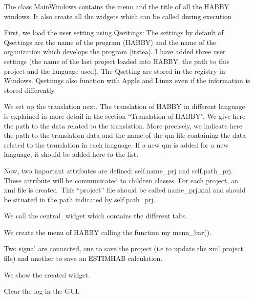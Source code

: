 \documentclass[letterpaper,10pt,english]{sphinxmanual}
\begin{document}
\begin{fulllineitems}
\label{\detokenize{index:src_GUI.Main_windows_1.MainWindows}}
The class MainWindows contains the menu and the title of all the HABBY windows.
It also create all the widgets which can be called during execution


First, we load the user setting using Qsettings: The settings by default of Qsettings are the name of the program (HABBY) and
the name of the organization which develops the program (irstea).  I have added three user settings (the name of the
last project loaded into HABBY, the path to this project and the language used). The Qsetting are stored in the
registry in Windows. Qsettings also function with Apple and Linux even if the information is stored differently

We set up the translation next. The translation of HABBY in different language is explained in more detail in
the section “Translation of HABBY”. We give here the path to the data related to the translation. More precisely, we indicate
here the path to the translation data and the name of the qm file containing the data related to the translation
in each language. If a new qm is added for a new language, it should be added here to the list.

Now, two important attributes are defined: self.name\_prj and self.path\_prj. These attribute will be communicated to
children classes. For each project, an xml file is created. This “project” file should be called name\_prj.xml
and should be situated in the path indicated by self.path\_prj.

We call the central\_widget which contains the different tabs.

We create the menu of HABBY calling the function my menu\_bar().

Two signal are connected, one to save the project (i.e to update the xml project file) and another to save an
ESTIMHAB calculation.

We show the created widget.

\begin{fulllineitems}
\label{\detokenize{index:src_GUI.Main_windows_1.MainWindows.clear_log}}
Clear the log in the GUI.


\end{fulllineitems}
\end{fulllineitems}
\end{document}
